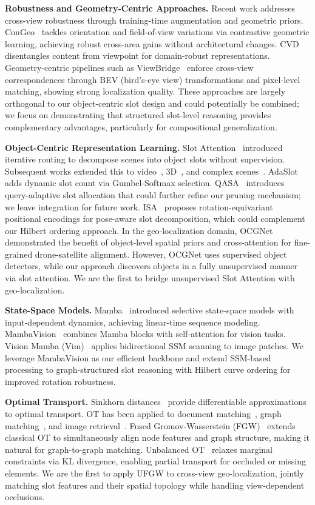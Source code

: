 \documentclass{article}
\begin{document}
\textbf{Robustness and Geometry-Centric Approaches.}
Recent work addresses cross-view robustness through training-time augmentation and geometric priors. ConGeo~\cite{congeo} tackles orientation and field-of-view variations via contrastive geometric learning, achieving robust cross-area gains without architectural changes. CVD~\cite{cvd} disentangles content from viewpoint for domain-robust representations. Geometry-centric pipelines such as ViewBridge~\cite{viewbridge} enforce cross-view correspondences through BEV (bird's-eye view) transformations and pixel-level matching, showing strong localization quality. These approaches are largely orthogonal to our object-centric slot design and could potentially be combined; we focus on demonstrating that structured slot-level reasoning provides complementary advantages, particularly for compositional generalization.

\textbf{Object-Centric Representation Learning.}
Slot Attention~\cite{slotattention} introduced iterative routing to decompose scenes into object slots without supervision. Subsequent works extended this to video~\cite{savi}, 3D~\cite{osrt}, and complex scenes~\cite{dinosaur}. AdaSlot~\cite{adaslot} adds dynamic slot count via Gumbel-Softmax selection. QASA~\cite{qasa2023} introduces query-adaptive slot allocation that could further refine our pruning mechanism; we leave integration for future work. ISA~\cite{isa2023} proposes rotation-equivariant positional encodings for pose-aware slot decomposition, which could complement our Hilbert ordering approach. In the geo-localization domain, OCGNet~\cite{ocgnet} demonstrated the benefit of object-level spatial priors and cross-attention for fine-grained drone-satellite alignment. However, OCGNet uses supervised object detectors, while our approach discovers objects in a fully unsupervised manner via slot attention. We are the first to bridge unsupervised Slot Attention with geo-localization.

\textbf{State-Space Models.}
Mamba~\cite{mamba} introduced selective state-space models with input-dependent dynamics, achieving linear-time sequence modeling. MambaVision~\cite{mambavision} combines Mamba blocks with self-attention for vision tasks. Vision Mamba (Vim)~\cite{vim} applies bidirectional SSM scanning to image patches. We leverage MambaVision as our efficient backbone and extend SSM-based processing to graph-structured slot reasoning with Hilbert curve ordering for improved rotation robustness.

\textbf{Optimal Transport.}
Sinkhorn distances~\cite{cuturi2013} provide differentiable approximations to optimal transport. OT has been applied to document matching~\cite{kusner2015}, graph matching~\cite{xu2019gromov}, and image retrieval~\cite{liu2023ot}. Fused Gromov-Wasserstein (FGW)~\cite{titouan2019fgw} extends classical OT to simultaneously align node features and graph structure, making it natural for graph-to-graph matching. Unbalanced OT~\cite{chizat2018uot} relaxes marginal constraints via KL divergence, enabling partial transport for occluded or missing elements. We are the first to apply UFGW to cross-view geo-localization, jointly matching slot features and their spatial topology while handling view-dependent occlusions.
\end{document}
